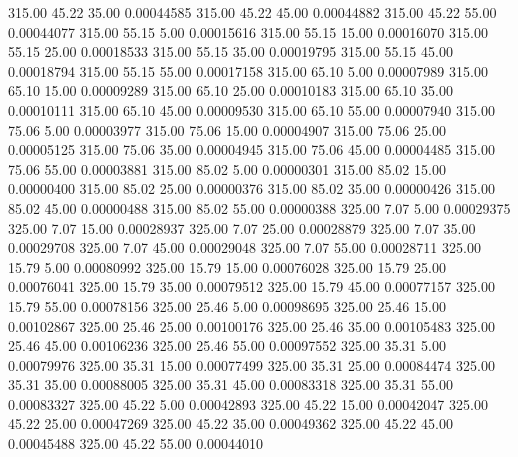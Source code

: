     315.00     45.22     35.00     0.00044585
    315.00     45.22     45.00     0.00044882
    315.00     45.22     55.00     0.00044077
    315.00     55.15      5.00     0.00015616
    315.00     55.15     15.00     0.00016070
    315.00     55.15     25.00     0.00018533
    315.00     55.15     35.00     0.00019795
    315.00     55.15     45.00     0.00018794
    315.00     55.15     55.00     0.00017158
    315.00     65.10      5.00     0.00007989
    315.00     65.10     15.00     0.00009289
    315.00     65.10     25.00     0.00010183
    315.00     65.10     35.00     0.00010111
    315.00     65.10     45.00     0.00009530
    315.00     65.10     55.00     0.00007940
    315.00     75.06      5.00     0.00003977
    315.00     75.06     15.00     0.00004907
    315.00     75.06     25.00     0.00005125
    315.00     75.06     35.00     0.00004945
    315.00     75.06     45.00     0.00004485
    315.00     75.06     55.00     0.00003881
    315.00     85.02      5.00     0.00000301
    315.00     85.02     15.00     0.00000400
    315.00     85.02     25.00     0.00000376
    315.00     85.02     35.00     0.00000426
    315.00     85.02     45.00     0.00000488
    315.00     85.02     55.00     0.00000388
    325.00      7.07      5.00     0.00029375
    325.00      7.07     15.00     0.00028937
    325.00      7.07     25.00     0.00028879
    325.00      7.07     35.00     0.00029708
    325.00      7.07     45.00     0.00029048
    325.00      7.07     55.00     0.00028711
    325.00     15.79      5.00     0.00080992
    325.00     15.79     15.00     0.00076028
    325.00     15.79     25.00     0.00076041
    325.00     15.79     35.00     0.00079512
    325.00     15.79     45.00     0.00077157
    325.00     15.79     55.00     0.00078156
    325.00     25.46      5.00     0.00098695
    325.00     25.46     15.00     0.00102867
    325.00     25.46     25.00     0.00100176
    325.00     25.46     35.00     0.00105483
    325.00     25.46     45.00     0.00106236
    325.00     25.46     55.00     0.00097552
    325.00     35.31      5.00     0.00079976
    325.00     35.31     15.00     0.00077499
    325.00     35.31     25.00     0.00084474
    325.00     35.31     35.00     0.00088005
    325.00     35.31     45.00     0.00083318
    325.00     35.31     55.00     0.00083327
    325.00     45.22      5.00     0.00042893
    325.00     45.22     15.00     0.00042047
    325.00     45.22     25.00     0.00047269
    325.00     45.22     35.00     0.00049362
    325.00     45.22     45.00     0.00045488
    325.00     45.22     55.00     0.00044010
